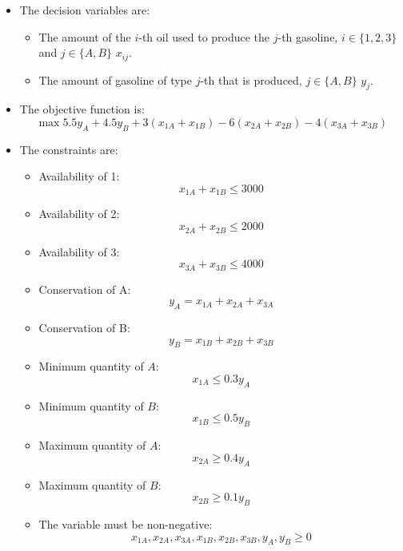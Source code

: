 \documentclass[12pt, a4paper]{report}
\newtheorem[style=M,bodystyle=\normalfont]{theorem}{Theorem}
\newtheorem[style=M,bodystyle=\normalfont]{corollary}{Corollary}
\newtheorem[style=M,bodystyle=\normalfont]{lemma}{Lemma}
\newtheorem[style=M,bodystyle=\normalfont]{definition}{Definition}
\begin{document}
\begin{Answer}[ref=2]
    \begin{itemize}
        \item The decision variables are:
            \begin{itemize}
                \item The amount of the $i$-th oil used to produce the $j$-th gasoline, $i \in \{1,2,3\}$ and $j \in \{A,B\}$ $x_{ij}$. 
                \item The amount of gasoline of type $j$-th that is produced, $j \in \{A,B\}$ $y_j$. 
            \end{itemize}
        \item The objective function is: 
            \[\max{5.5y_A+4.5y_B+3(x_{1A}+x_{1B})-6(x_{2A}+x_{2B})-4(x_{3A}+x_{3B})}\]
        \item The constraints are:
            \begin{itemize}
                \item Availability of 1: 
                    \[x_{1A}+x_{1B} \leq 3 000\]
                \item Availability of 2:
                    \[x_{2A}+x_{2B} \leq 2 000\]
                \item Availability of 3:  
                    \[x_{3A}+x_{3B} \leq 4 000\]
                \item Conservation of A:
                    \[y_A=x_{1A}+x_{2A}+x_{3A}\]
                \item Conservation of B:
                    \[y_B=x_{1B}+x_{2B}+x_{3B}\]
                \item Minimum quantity of $A$: 
                    \[x_{1A} \leq 0.3y_A\]
                \item Minimum quantity of $B$: 
                    \[x_{1B} \leq 0.5y_B\]
                \item Maximum quantity of $A$: 
                    \[x_{2A} \geq 0.4y_A\]
                \item Maximum quantity of $B$: 
                    \[x_{2B} \geq 0.1y_B\]
                \item The variable must be non-negative: 
                    \[x_{1A},x_{2A},x_{3A},x_{1B},x_{2B},x_{3B},y_A,y_B \geq 0\]  
            \end{itemize}
    \end{itemize}
\end{Answer}

\newpage

\newpage
\end{document}
